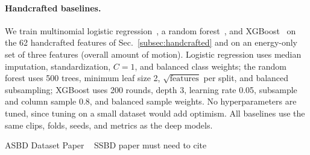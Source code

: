 \documentclass[10pt,twocolumn,letterpaper]{article}
\begin{document}
\paragraph{Handcrafted baselines.}
We train multinomial logistic regression~\cite{KEY_logreg}, a random forest~\cite{KEY_rf}, and XGBoost~\cite{KEY_xgboost} on the 62 handcrafted features of Sec.~\ref{subsec:handcrafted} and on an energy-only set of three features (overall amount of motion). Logistic regression uses median imputation, standardization, $C{=}1$, and balanced class weights; the random forest uses 500 trees, minimum leaf size 2, $\sqrt{\text{features}}$ per split, and balanced subsampling; XGBoost uses 200 rounds, depth 3, learning rate 0.05, subsample and column sample 0.8, and balanced sample weights. No hyperparameters are tuned, since tuning on a small dataset would add optimism. All baselines use the same clips, folds, seeds, and metrics as the deep models.






ASBD Dataset Paper ~\cite{ribeiro2023stimming}
SSBD paper must need to cite ~\cite{rajagopalan2013self}


{
    \small
    
    
}





\end{document}
